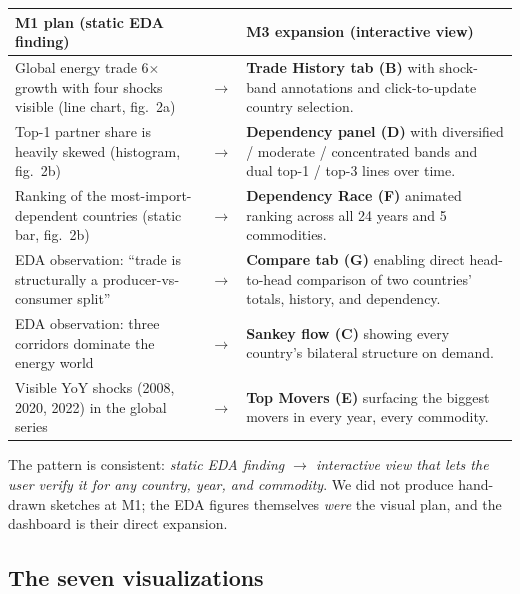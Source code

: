 \documentclass[a4paper,10pt]{article}
\begin{document}
\begin{table}[H]
\centering\small
\renewcommand{\arraystretch}{1.25}
\begin{tabular}{@{}p{5.2cm}p{1cm}p{9.6cm}@{}}
\toprule
\textbf{M1 plan (static EDA finding)} & & \textbf{M3 expansion (interactive view)} \\
\midrule
Global energy trade 6$\times$ growth with four shocks visible (line chart, fig.~2a) &
$\rightarrow$ &
\textbf{Trade History tab (B)} with shock-band annotations and click-to-update country selection. \\
Top-1 partner share is heavily skewed (histogram, fig.~2b) &
$\rightarrow$ &
\textbf{Dependency panel (D)} with diversified / moderate / concentrated bands and dual top-1 / top-3 lines over time. \\
Ranking of the most-import-dependent countries (static bar, fig.~2b) &
$\rightarrow$ &
\textbf{Dependency Race (F)} animated ranking across all 24 years and 5 commodities. \\
EDA observation: ``trade is structurally a producer-vs-consumer split'' &
$\rightarrow$ &
\textbf{Compare tab (G)} enabling direct head-to-head comparison of two countries' totals, history, and dependency. \\
EDA observation: three corridors dominate the energy world &
$\rightarrow$ &
\textbf{Sankey flow (C)} showing every country's bilateral structure on demand. \\
Visible YoY shocks (2008, 2020, 2022) in the global series &
$\rightarrow$ &
\textbf{Top Movers (E)} surfacing the biggest movers in every year, every commodity. \\
\bottomrule
\end{tabular}
\end{table}

The pattern is consistent: \emph{static EDA finding $\rightarrow$ interactive
view that lets the user verify it for any country, year, and commodity}. We
did not produce hand-drawn sketches at M1; the EDA figures themselves
\emph{were} the visual plan, and the dashboard is their direct expansion.

\subsection{The seven visualizations}
\end{document}
